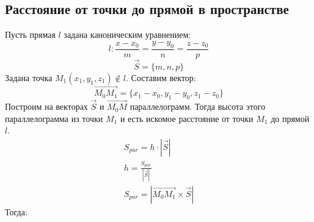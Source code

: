 \subsection{Расстояние от точки до прямой в пространстве}

Пусть прямая $l$ задана каноническим уравнением:  \[
l: \frac{x - x_0}{m} = \frac{y - y_0}{n} = \frac{z - z_0}{p}
\] \[
\vec{S} = \{m, n, p\} 
\] 
Задана точка $M_1(x_1, y_1, z_1) \not \in l$.
Составим вектор:  \[
\overrightarrow{M_0M_1} = \{x_1 - x_0, y_1 - y_0, z_1 - z_0\} 
\] 
Построим на векторах $\vec{S}$ и $\overrightarrow{M_0M}$ параллелограмм.
Тогда высота этого параллелограмма из точки $M_1$ и есть искомое расстояние от точки $M_1$ до прямой $l$.
\begin{gather*}
  S_{par} = h \cdot |\vec{S}| \\
  h = \frac{S_{par}}{|\vec{S}|} \\
  S_{par} = |\overrightarrow{M_0M_1} \times \vec{S}| 
\end{gather*}
Тогда:
